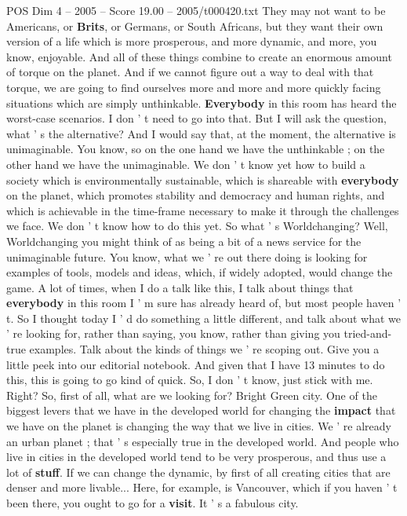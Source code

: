 \begin{textsample}{POS Dim 4 – 2005 – Score 19.00 – 2005/t000420.txt}
They may not want to be Americans, or \textbf{Brits}, or Germans, or South Africans, but they want their own version of a life which is more prosperous, and more dynamic, and more, you know, enjoyable.
And all of these things combine to create an enormous amount of torque on the planet.
And if we cannot figure out a way to deal with that torque, we are going to find ourselves more and more and more quickly facing situations which are simply unthinkable. \textbf{Everybody} in this room has heard the worst-case scenarios.
I don ' t need to go into that.
But I will ask the question, what ' s the alternative?
And I would say that, at the moment, the alternative is unimaginable.
You know, so on the one hand we have the unthinkable ; on the other hand we have the unimaginable.
We don ' t know yet how to build a society which is environmentally sustainable, which is shareable with \textbf{everybody} on the planet, which promotes stability and democracy and human rights, and which is achievable in the time-frame necessary to make it through the challenges we face.
We don ' t know how to do this yet.
So what ' s Worldchanging?
Well, Worldchanging you might think of as being a bit of a news service for the unimaginable future.
You know, what we ' re out there doing is looking for examples of tools, models and ideas, which, if widely adopted, would change the game.
A lot of times, when I do a talk like this, I talk about things that \textbf{everybody} in this room I ' m sure has already heard of, but most people haven ' t.
So I thought today I ' d do something a little different, and talk about what we ' re looking for, rather than saying, you know, rather than giving you tried-and-true examples.
Talk about the kinds of things we ' re scoping out.
Give you a little peek into our editorial notebook.
And given that I have 13 minutes to do this, this is going to go kind of quick.
So, I don ' t know, just stick with me.
Right?
So, first of all, what are we looking for?
Bright Green city.
One of the biggest levers that we have in the developed world for changing the \textbf{impact} that we have on the planet is changing the way that we live in cities.
We ' re already an urban planet ; that ' s especially true in the developed world.
And people who live in cities in the developed world tend to be very prosperous, and thus use a lot of \textbf{stuff}.
If we can change the dynamic, by first of all creating cities that are denser and more livable...
Here, for example, is Vancouver, which if you haven ' t been there, you ought to go for a \textbf{visit}.
It ' s a fabulous city.

\end{textsample}
